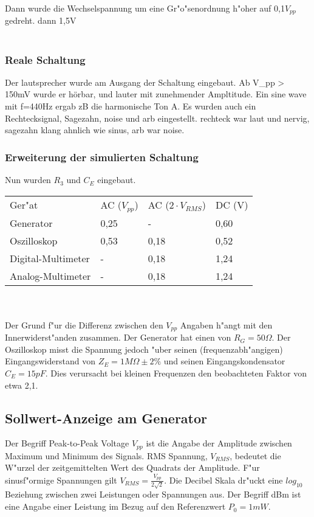 \documentclass[10pt]{article}
\begin{document}
Dann wurde die Wechselspannung um eine Gr"o"senordnung h"oher auf 0,1$V_{pp}$gedreht. dann 1,5V\\ \\
\subsubsection{Reale Schaltung}
Der lautsprecher wurde am Ausgang der Schaltung eingebaut. Ab V_pp > 150mV wurde er hörbar, und lauter mit zunehmender Ampltitude. Ein sine wave mit f=440Hz ergab zB die harmonische Ton A. Es wurden auch ein Rechtecksignal, Sagezahn, noise und arb eingestellt. rechteck war laut und nervig, sagezahn klang ahnlich wie sinus, arb war noise.

\subsubsection{Erweiterung der simulierten Schaltung}
Nun wurden $R_3$ und $C_E$ eingebaut.
\begin{tabular}{l l l l}
Ger"at & AC ($V_{pp}$) & AC ($2 \cdot V_{RMS}$) & DC (V) \\
Generator & 0,25 & - & 0,60 \\
Oszilloskop & 0,53 & 0,18 & 0,52  \\
Digital-Multimeter & - & 0,18 & 1,24  \\
Analog-Multimeter & - & 0,18 & 1,24 \\
\end{tabular}\\\\

Der Grund f"ur die Differenz zwischen den $V_{pp}$ Angaben h"angt mit den Innerwiderst"anden zusammen. Der Generator hat einen von $R_G=50 \Omega$. Der Oszilloskop misst die Spannung jedoch "uber seinen (frequenzabh"angigen) Eingangswiderstand von $Z_E=1 M\Omega \pm 2\%$ und seinen Eingangskondensator $C_E=15 pF$. Dies verursacht bei kleinen Frequenzen den beobachteten Faktor von etwa 2,1.

\subsection{Sollwert-Anzeige am Generator}
Der Begriff Peak-to-Peak Voltage $V_{pp}$ ist die Angabe der Amplitude zwischen Maximum und Minimum des Signals. RMS Spannung, $V_{RMS}$, bedeutet die W"urzel der zeitgemittelten Wert des Quadrats der Amplitude. F"ur sinusf"ormige Spannungen gilt $V_{RMS}=\frac{V_{pp}}{2 \sqrt{2}}$. Die Decibel Skala dr"uckt eine $log_{10}$ Beziehung zwischen zwei Leistungen oder Spannungen aus. Der Begriff dBm ist eine Angabe einer Leistung im Bezug auf den Referenzwert $P_0=1mW$.\\
\end{document}

